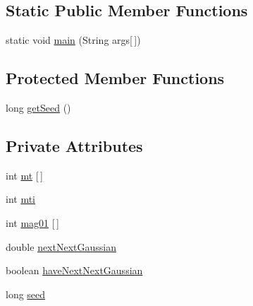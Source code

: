 \subsection*{Static Public Member Functions}
\begin{DoxyCompactItemize}
\item 
static void \hyperlink{classjenes_1_1utils_1_1_mersenne_twister_fast_a5c955ea4cf1b925290dd92ddecc0c510}{main} (String args\mbox{[}$\,$\mbox{]})
\end{DoxyCompactItemize}
\subsection*{Protected Member Functions}
\begin{DoxyCompactItemize}
\item 
long \hyperlink{classjenes_1_1utils_1_1_mersenne_twister_fast_a88963c0469e0bad7a1834469cf0f7a10}{get\-Seed} ()
\end{DoxyCompactItemize}
\subsection*{Private Attributes}
\begin{DoxyCompactItemize}
\item 
int \hyperlink{classjenes_1_1utils_1_1_mersenne_twister_fast_a982d8674fe867dbc2ed4d81e346bd53e}{mt} \mbox{[}$\,$\mbox{]}
\item 
int \hyperlink{classjenes_1_1utils_1_1_mersenne_twister_fast_a249ff994b5401de034349bd26d1048a5}{mti}
\item 
int \hyperlink{classjenes_1_1utils_1_1_mersenne_twister_fast_ab47bd6db1f44c11be545d52af445754a}{mag01} \mbox{[}$\,$\mbox{]}
\item 
double \hyperlink{classjenes_1_1utils_1_1_mersenne_twister_fast_aabc67f7eb3dd3b7d139ee7211ae88d72}{next\-Next\-Gaussian}
\item 
boolean \hyperlink{classjenes_1_1utils_1_1_mersenne_twister_fast_a5386c1c630b71ef34d7ff55a040fa2a0}{have\-Next\-Next\-Gaussian}
\item 
long \hyperlink{classjenes_1_1utils_1_1_mersenne_twister_fast_af54ad21e36a866d458e55ad8c3d89ac2}{seed}
\end{DoxyCompactItemize}
